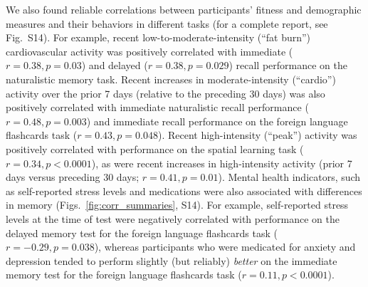 \documentclass[10pt]{article}
\newcommand{\allCorr}{S14}
\begin{document}
We also found reliable correlations between participants' fitness and
demographic measures and their behaviors in different tasks
(for a complete report, see Fig.~\allCorr).  For example, recent
low-to-moderate-intensity (``fat burn'') 
cardiovascular activity was positively
correlated with immediate ($r = 0.38, p = 0.03$) and delayed ($r =
0.38, p = 0.029$) recall performance on the naturalistic
memory task.  Recent increases in moderate-intensity (``cardio'')
activity over the prior 7 days (relative to the preceding 30 days) was
also positively correlated with immediate naturalistic recall
performance ($r =
0.48, p = 0.003$) and immediate recall performance on the foreign language
flashcards task ($r = 0.43, p = 0.048$).  Recent high-intensity
(``peak'') activity was positively correlated with performance on the
spatial learning task ($r = 0.34, p < 0.0001$), as were recent increases
in high-intensity activity (prior 7 days versus preceding 30 days; $r
= 0.41, p = 0.01$).  Mental health indicators, such as self-reported
stress levels and medications were also associated with differences in
memory (Figs.~\ref{fig:corr_summaries}, \allCorr).  For example, self-reported stress levels at the time of test
were negatively correlated with performance on the delayed memory test
for the foreign language flashcards task ($r = -0.29, p = 0.038$),
whereas participants who were medicated for anxiety and depression
tended to perform slightly (but reliably) \textit{better} on the immediate memory test for the
foreign language flashcards task ($r = 0.11, p < 0.0001$).
\end{document}
